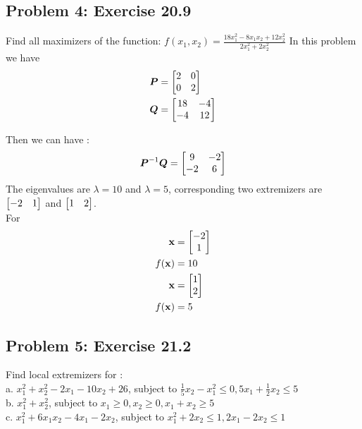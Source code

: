 \documentclass{article}
\begin{document}
\hypertarget{}{}
\subsection*{{Problem 4: Exercise 20.9}}
\label{}
Find all maximizers of the function: $f(x_1, x_2) = \frac{18x_1^2-8x_1x_2 + 12x_2^2}{2x_1^2 + 2x_2^2 } $ 
In this problem we have 
\begin{align*} 
\boldsymbol{P} & = \begin{bmatrix}  2 & 0 \\ 0 & 2  \end{bmatrix}  \\
\boldsymbol{Q} & = \begin{bmatrix} 18 & -4 \\ -4 & 12 \end{bmatrix} \\
\end{align*} 

Then we can have : \\ 
\begin{align*} 
\boldsymbol{P}^{-1}\boldsymbol{Q} = \begin{bmatrix} 9 & -2 \\ -2 & 6  \end{bmatrix} \\
\end{align*} 
The eigenvalues are $\lambda = 10 $ and $\lambda = 5$, corresponding two extremizers are $\begin{bmatrix} -2 & 1 \end{bmatrix} $ and $\begin{bmatrix} 1 & 2  \end{bmatrix} $. \\
For \begin{align*} 
\boldsymbol{\mathrm{x}} &= \begin{bmatrix} -2 \\ 1 \end{bmatrix} \\
f(\boldsymbol{\mathrm{x}} )& = 10  \\
\boldsymbol{\mathrm{x}} &= \begin{bmatrix} 1 \\ 2 \end{bmatrix} \\
f(\boldsymbol{\mathrm{x}} )& = 5  \\
\end{align*}


\hypertarget{}{}
\subsection*{{Problem 5: Exercise 21.2}}
\label{}
Find local extremizers for : \\
a. $x_1^2 + x_2^2 -2x_1 - 10x_2 + 26 $,  subject to $\frac{1}{5} x_2 -x_1^2 \leq 0, 5x_1+\frac{1}{2}x_2\leq5$ \\
b. $x_1^2 +x_2^2 $, subject to $x_1 \geq0, x_2\geq0, x_1+x_2\geq 5$ \\
c. $x_1^2 +6x_1x_2 -4x_1 -2x_2 $,  subject to $x_1^2 +2x_2\leq1, 2x_1-2x_2 \leq 1$ 
\end{document}
